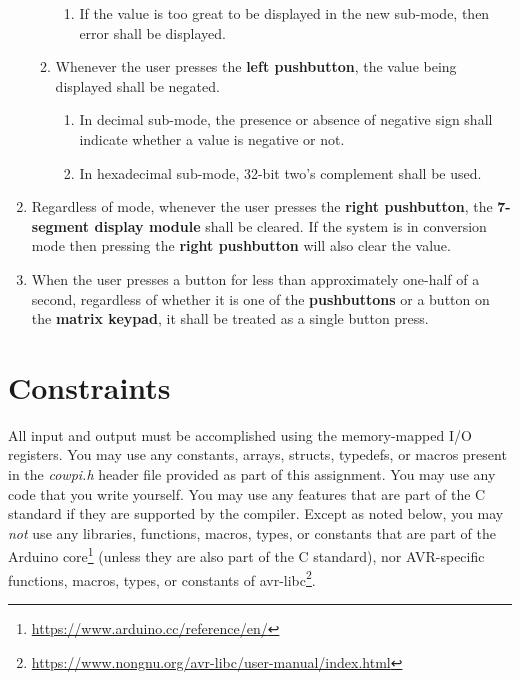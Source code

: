 \begin{enumerate}
\begin{enumerate}
\begin{enumerate}
        \item If the value is too great to be displayed in the new sub-mode,
            then {\dviiseg error} shall be displayed.
        \end{enumerate}
    \item Whenever the user presses the \textbf{left pushbutton}, the value
        being displayed shall be negated.
        \begin{enumerate}
        \item In decimal sub-mode, the presence or absence of negative sign
            shall indicate whether a value is negative or not.
        \item In hexadecimal sub-mode, 32-bit two's complement shall be used.
        \end{enumerate}
    \end{enumerate}
    \item Regardless of mode, whenever the user presses the \textbf{right
        pushbutton}, the \textbf{7-segment display module} shall be cleared. If
        the system is in conversion mode then pressing the \textbf{right
        pushbutton} will also clear the value.
    \item When the user presses a button for less than approximately one-half of a second, regardless of whether it is one of the \textbf{pushbuttons} or a button on the \textbf{matrix keypad}, it shall be treated as a single button press.
\end{enumerate}

\section{Constraints}\label{sec:Constraints}

All input and output must be accomplished using the memory-mapped I/O
registers. You may use any constants, arrays, structs, typedefs, or macros
present in the \textit{cowpi.h} header file provided as part of this
assignment. You may use any code that you write yourself. You may use any
features that are part of the C standard if they are supported by the
compiler. Except as noted below, you may \textit{not} use any libraries,
functions, macros, types, or constants that are part of the Arduino
core\footnote{\url{https://www.arduino.cc/reference/en/}} (unless they are
also part of the C standard), nor AVR-specific functions, macros, types, or
constants of avr-libc\footnote{\url{https://www.nongnu.org/avr-libc/user-manual/index.html}}.

